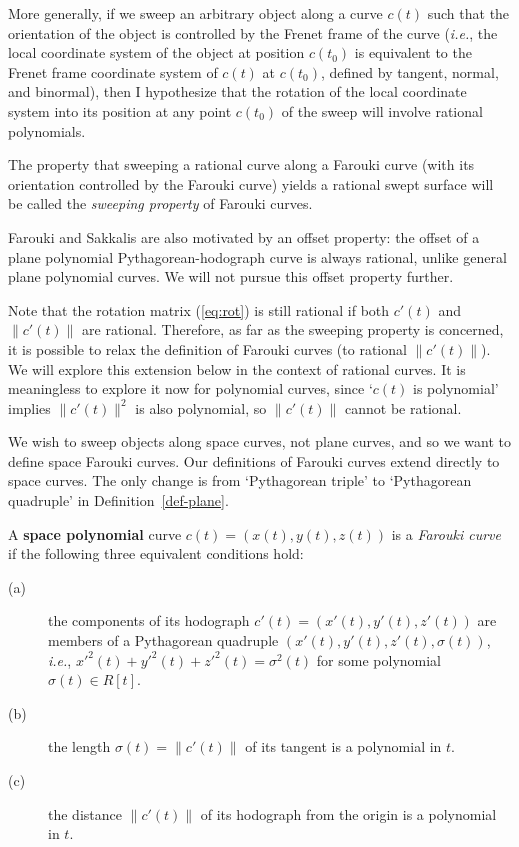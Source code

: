 \begin{rmk}
More generally, if we sweep an arbitrary object along a curve $c(t)$
such that the orientation of the object is controlled by the
Frenet frame of the curve ({\em i.e.}, the local coordinate system 
of the object at position $c(t_0)$ is equivalent to the Frenet frame 
coordinate system of $c(t)$ at $c(t_0)$, defined by tangent, normal,
and binormal),
then I hypothesize that the rotation of the local coordinate system 
into its position
at any point $c(t_0)$ of the sweep will involve rational polynomials.

The property that sweeping a rational curve along a Farouki curve
(with its orientation controlled by the Farouki curve)
yields a rational swept surface will be called the {\em sweeping
property} of Farouki curves.
\end{rmk}

\clearpage

\begin{rmk}
Farouki and Sakkalis \cite{FS90} are also motivated by an offset property:
the offset of a plane polynomial Pythagorean-hodograph curve is
always rational, unlike general plane polynomial curves.
We will not pursue this offset property further.
\end{rmk}

\begin{rmk}
\label{stillrat}
Note that the rotation matrix (\ref{eq:rot}) is still rational if both
$c'(t)$ and $\| c'(t) \|$ are rational.
Therefore, as far as the sweeping property is concerned,
it is possible to relax the definition of Farouki curves 
(to rational $\| c'(t) \|$).
We will explore this extension below in the context of rational curves.
It is meaningless to explore it now for polynomial curves,
since `$c(t)$ is polynomial' implies $\| c'(t) \|^2$ is also polynomial,
so $\| c'(t) \|$ cannot be rational.
\end{rmk}

We wish to sweep objects along space curves, not plane curves,
and so we want to define space Farouki curves.
Our definitions of Farouki curves extend directly to space curves.
The only change is from `Pythagorean triple' to `Pythagorean quadruple'
in Definition~\ref{def-plane}.


\begin{dfn}
\label{def-space}
A {\bf space polynomial} curve $c(t) = (x(t),y(t),z(t))$
is a {\em Farouki curve} if the following three equivalent conditions hold:
\begin{description}
\item[(a)]
	the components of its hodograph $c'(t) = (x'(t),y'(t),z'(t))$
	are members of a Pythagorean quadruple $(x'(t),y'(t),z'(t),\sigma(t))$,
	{\em i.e.}, $x'^2(t) + y'^2(t) + z'^2(t) = \sigma^2(t)$ for some
	polynomial $\sigma(t) \in R[t]$.
\item[(b)]
	the length $\sigma(t) = \| c'(t) \|$ of its tangent
	is a polynomial in $t$.
\item[(c)]
	the distance $\| c'(t) \|$ of its hodograph from the origin
	is a polynomial in $t$.
\end{description}
\end{dfn}

